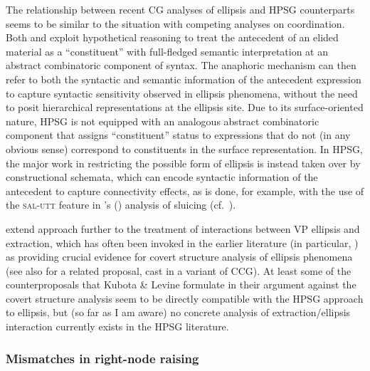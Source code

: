 \documentclass[output=paper
                ,modfonts
 	        ,biblatex
                ,babelshorthands
                ,newtxmath
                ,draftmode
                ,colorlinks, citecolor=brown
]{langscibook}
\begin{document}
The relationship between recent CG analyses of ellipsis and
HPSG counterparts seems to be similar to the situation with competing
analyses on coordination. Both \citet{barker-sluicing} and
\citet{kubota-levine-pseudo} exploit hypothetical reasoning to treat the
antecedent of an elided material as a ``constituent'' with full-fledged
semantic interpretation at an abstract combinatoric component of
syntax. The anaphoric mechanism can then refer to both the syntactic
and semantic information of the antecedent expression to capture
syntactic sensitivity observed in ellipsis phenomena, without the need
to posit hierarchical representations at the ellipsis site. Due to its
surface-oriented nature, HPSG is not equipped with an analogous
abstract combinatoric component that assigns ``constituent'' status to
expressions that do not (in any obvious sense) correspond to
constituents in the surface representation. In HPSG, the major work in
restricting the possible form of ellipsis is instead
taken over by constructional schemata, which can encode
syntactic information of the antecedent to capture connectivity
effects, as is done, for example, with the use of the 
\textsc{sal-utt} feature in \citeauthor{GSag2000a-u}'s 
(\citeyear[Chapter~8]{GSag2000a-u}) analysis of sluicing
(cf.~).

\citet[Chapter~8]{KubotaLevineBook} extend 
 approach further to the treatment of
interactions between  VP ellipsis and extraction, which has often been
invoked in the earlier literature (in particular, \citealt{kennedy2003})
as providing crucial evidence for  covert structure analysis of
ellipsis phenomena (see also \citealt{Jacobson14ellipsis} for a related
proposal, cast in a variant of CCG).
At least some of the counterproposals that Kubota \& Levine formulate
in their argument against the covert structure analysis seem to be
directly compatible with the HPSG approach to ellipsis,  but (so far
as I am aware)  no concrete analysis of extraction/ellipsis
interaction currently exists in the HPSG literature.




\subsubsection{Mismatches in right-node raising}
\end{document}
